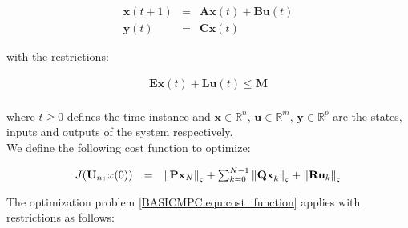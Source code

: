 	    \begin{equation}
        \begin{array}{rcl}
            \textbf{x}(t+1)&=&\textbf{Ax}(t)+\textbf{Bu}(t)\\
						\textbf{y}(t)&=&\textbf{Cx}(t)
        \end{array}
        \label{BASICMPC:equ:basic_LTI}
    \end{equation}
		
	with the restrictions:
	
	\begin{equation}
        \begin{array}{rcl}
            \textbf{Ex}(t)+\textbf{Lu}(t)\leq \textbf{M}\\
        \end{array}
        \label{BASICMPC:equ:restrict_LTI}
    \end{equation}
		
		where $t\geq0$ defines the time instance and $\textbf{x}\in \mathbb{R}^n$, $\textbf{u}\in \mathbb{R}^m$, $\textbf{y}\in \mathbb{R}^p$ are the states, inputs and outputs of the system respectively. \\
	 We define the following cost function to optimize:
		
		\begin{equation}
        \begin{array}{rcl}
         J(\textbf{U}_n,x(0))&=&\left\lVert{\textbf{Px}_N}\right\rVert_\varsigma+\sum^{N-1}_{k=0}\left\lVert\textbf{Qx}_k\right\rVert_\varsigma+\left\lVert\textbf{Ru}_k\right\rVert_\varsigma\\
        \end{array}
        \label{BASICMPC:equ:cost_function}
    \end{equation}
		
		The optimization problem \ref{BASICMPC:equ:cost_function} applies with restrictions as follows:
		
